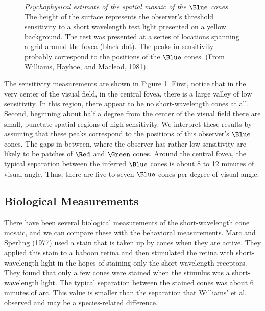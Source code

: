 \begin{figure}
\centerline{
}
\caption[Short-wavelength Cone Mosaic:  Psychophysics]{
{\em Psychophysical estimate of the spatial mosaic of the $\Blue$ cones.}
The height of the surface represents
the observer's threshold sensitivity
to a short wavelength test light presented on a yellow background.
The test was presented at a series
of locations spanning a grid around the fovea (black dot).
The peaks in sensitivity probably correspond to the
positions of the $\Blue$ cones.
(From Williams, Hayhoe, and Macleod, 1981).
}
\label{f2:williams.dat}
\end{figure}
The sensitivity measurements are shown
in Figure \ref{f2:williams.dat}.
First, notice that in the very center of the visual field, in
the central fovea, there is a large valley of
low sensitivity.
In this region, there appear to be no short-wavelength cones
at all.
Second, beginning about half a degree from
the center of the visual field there are small, punctate spatial regions of
high sensitivity.
We interpret these results by
assuming that these peaks correspond to the
positions of this observer's $\Blue$ cones.
The gaps in between, where the observer has rather
low sensitivity are likely to be patches
of $\Red$ and $\Green$ cones.
Around the central fovea,
the typical separation between the
inferred $\Blue$ cones is about 8 to 12 minutes of visual
angle.
Thus, there are five to seven $\Blue$ cones per degree of visual angle.

\subsection*{Biological Measurements}
There have been several biological measurements
of the short-wavelength cone mosaic, and we can
compare these with the behavioral measurements.
Marc and Sperling (1977) used a stain that is taken up
by cones when they are active.
They applied this stain to a baboon retina and then
stimulated the retina with short-wavelength light
in the hopes of staining only the short-wavelength receptors.
They found that only a few cones
were stained when the stimulus was a short-wavelength light.
The typical separation between the stained cones
was about 6 minutes of arc.
This value is smaller than the separation 
that Williams' et al. observed and may be
a species-related difference.

